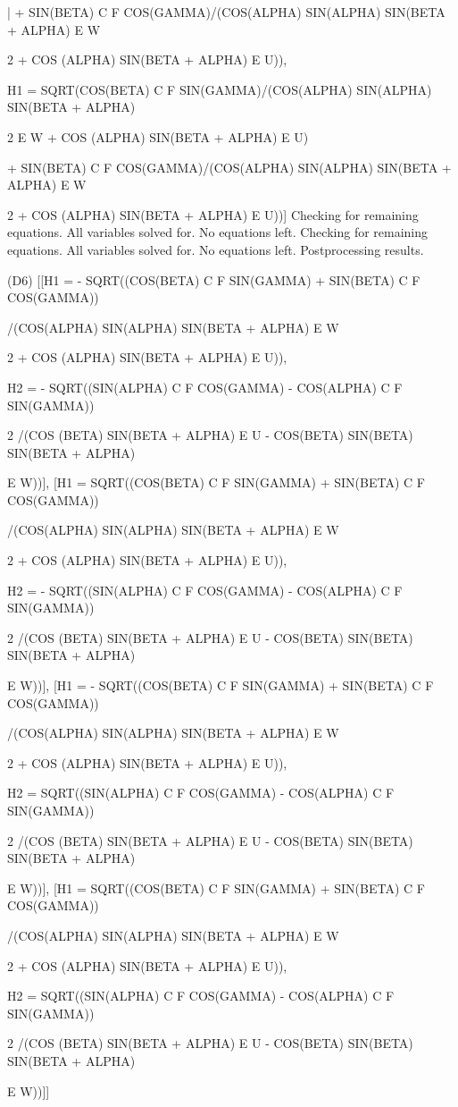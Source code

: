 \begin{literatim}{|}
 + SIN(BETA) C F COS(GAMMA)/(COS(ALPHA) SIN(ALPHA) SIN(BETA + ALPHA) E W

      2
 + COS (ALPHA) SIN(BETA + ALPHA) E U)), 

H1 = SQRT(COS(BETA) C F SIN(GAMMA)/(COS(ALPHA) SIN(ALPHA) SIN(BETA + ALPHA)

          2
 E W + COS (ALPHA) SIN(BETA + ALPHA) E U)

 + SIN(BETA) C F COS(GAMMA)/(COS(ALPHA) SIN(ALPHA) SIN(BETA + ALPHA) E W

      2
 + COS (ALPHA) SIN(BETA + ALPHA) E U))]
Checking for remaining equations.
All variables solved for. No equations left.
Checking for remaining equations.
All variables solved for. No equations left.
Postprocessing results.

(D6) [[H1 = - SQRT((COS(BETA) C F SIN(GAMMA) + SIN(BETA) C F COS(GAMMA))

/(COS(ALPHA) SIN(ALPHA) SIN(BETA + ALPHA) E W

      2
 + COS (ALPHA) SIN(BETA + ALPHA) E U)), 

H2 = - SQRT((SIN(ALPHA) C F COS(GAMMA) - COS(ALPHA) C F SIN(GAMMA))

     2
/(COS (BETA) SIN(BETA + ALPHA) E U - COS(BETA) SIN(BETA) SIN(BETA + ALPHA)

 E W))], [H1 = SQRT((COS(BETA) C F SIN(GAMMA) + SIN(BETA) C F COS(GAMMA))

/(COS(ALPHA) SIN(ALPHA) SIN(BETA + ALPHA) E W

      2
 + COS (ALPHA) SIN(BETA + ALPHA) E U)), 

H2 = - SQRT((SIN(ALPHA) C F COS(GAMMA) - COS(ALPHA) C F SIN(GAMMA))

     2
/(COS (BETA) SIN(BETA + ALPHA) E U - COS(BETA) SIN(BETA) SIN(BETA + ALPHA)

 E W))], [H1 = - SQRT((COS(BETA) C F SIN(GAMMA) + SIN(BETA) C F COS(GAMMA))

/(COS(ALPHA) SIN(ALPHA) SIN(BETA + ALPHA) E W

      2
 + COS (ALPHA) SIN(BETA + ALPHA) E U)), 

H2 = SQRT((SIN(ALPHA) C F COS(GAMMA) - COS(ALPHA) C F SIN(GAMMA))

     2
/(COS (BETA) SIN(BETA + ALPHA) E U - COS(BETA) SIN(BETA) SIN(BETA + ALPHA)

 E W))], [H1 = SQRT((COS(BETA) C F SIN(GAMMA) + SIN(BETA) C F COS(GAMMA))

/(COS(ALPHA) SIN(ALPHA) SIN(BETA + ALPHA) E W

      2
 + COS (ALPHA) SIN(BETA + ALPHA) E U)), 

H2 = SQRT((SIN(ALPHA) C F COS(GAMMA) - COS(ALPHA) C F SIN(GAMMA))

     2
/(COS (BETA) SIN(BETA + ALPHA) E U - COS(BETA) SIN(BETA) SIN(BETA + ALPHA)

 E W))]]
\end{literatim}


